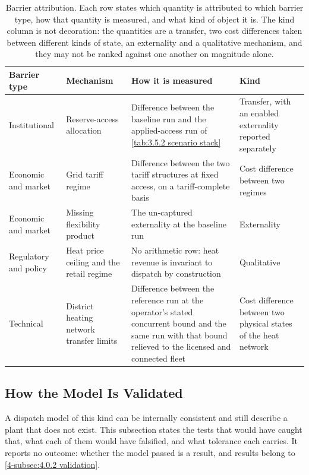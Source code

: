 \begin{table}[h]
\centering
\caption{Barrier attribution. Each row states which quantity is attributed to which barrier type, how that quantity is measured, and what kind of object it is. The kind column is not decoration: the quantities are a transfer, two cost differences taken between different kinds of state, an externality and a qualitative mechanism, and they may not be ranked against one another on magnitude alone.}
\small
\begin{tabular}{p{3.4cm} p{2.3cm} p{4.4cm} p{4.2cm}}
\toprule
\textbf{Barrier type} & \textbf{Mechanism} & \textbf{How it is measured} & \textbf{Kind} \\
\midrule
Institutional & Reserve-access allocation & Difference between the baseline run and the applied-access run of \autoref{tab:3.5.2 scenario stack} & Transfer, with an enabled externality reported separately \\
Economic and market & Grid tariff regime & Difference between the two tariff structures at fixed access, on a tariff-complete basis & Cost difference between two regimes \\
Economic and market & Missing flexibility product & The un-captured externality at the baseline run & Externality \\
Regulatory and policy & Heat price ceiling and the retail regime & No arithmetic row: heat revenue is invariant to dispatch by construction & Qualitative \\
Technical & District heating network transfer limits & Difference between the reference run at the operator's stated concurrent bound and the same run with that bound relieved to the licensed and connected fleet & Cost difference between two physical states of the heat network \\
\bottomrule
\end{tabular}
\label{tab:3.7 attribution}
\end{table}

\subsection{How the Model Is Validated}
\label{3-subsec:3.8 model validation}

A dispatch model of this kind can be internally consistent and still describe a plant that does not exist. This subsection states the tests that would have caught that, what each of them would have falsified, and what tolerance each carries. It reports no outcome: whether the model passed is a result, and results belong to \autoref{4-subsec:4.0.2 validation}.


